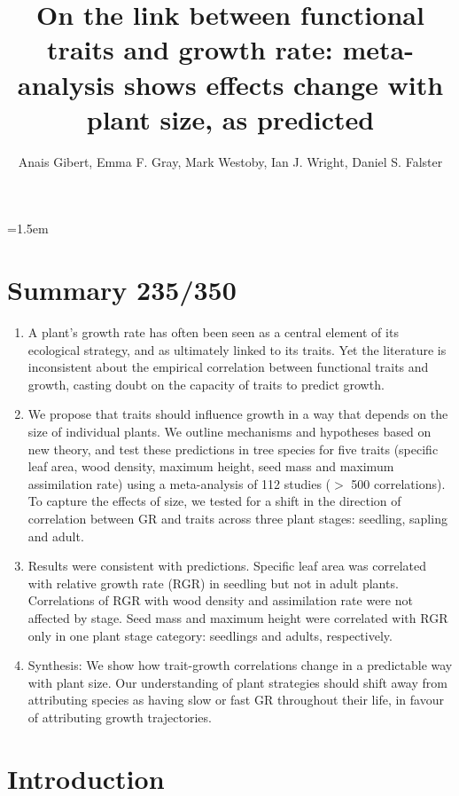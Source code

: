 \documentclass[a4paper,11pt]{article}
\title{On the link between functional traits and growth rate: meta-analysis shows effects change with plant size, as predicted}
\author{Anais Gibert\textasteriskcentered, Emma F. Gray, Mark Westoby, Ian J. Wright, Daniel S. Falster}
\affiliation{Biological Sciences, Macquarie University NSW 2109, Australia\\
\textasteriskcentered Email for correspondence: \texttt{anais.gibert@gmail.com}\\
Word count: ~5538 words (without supplementary material, Fig and ref)}
\date{}
\begin{document}
\mstitlepage
\noindent
\parindent=1.5em
\addtolength{\parskip}{.3em}
\doublespacing
\linenumbers
\section{Summary 235/350}\label{abstract}
\begin{enumerate}
\def\labelenumi{\arabic{enumi}.}
\itemsep1pt\parskip0pt
\item A plant's growth rate has often been seen as a central element of its ecological strategy, and as ultimately linked to its traits. Yet the literature is inconsistent about the empirical correlation between functional traits and growth, casting doubt on the capacity of traits to predict growth.

\item We propose that traits should influence growth in a way that depends on the size of individual plants. We outline mechanisms and hypotheses based on new theory, and test these predictions in tree species for five traits (specific leaf area, wood density, maximum height, seed mass and maximum assimilation rate) using a meta-analysis of 112 studies ($>$ 500 correlations). To capture the effects of size, we tested for a shift in the direction of correlation between GR and traits across three plant stages: seedling, sapling and adult.

\item Results were consistent with predictions. Specific leaf area was correlated with relative growth rate (RGR) in seedling but not in adult plants. Correlations of RGR with wood density and assimilation rate were not affected by stage. Seed mass and maximum height were correlated with RGR only in one plant stage category: seedlings and adults, respectively.

\item Synthesis: We show how trait-growth correlations change in a predictable way with plant size. Our understanding of plant strategies should shift away from attributing species as having slow or fast GR throughout their life, in favour of attributing growth trajectories.

\end{enumerate}

\clearpage

\section*{Introduction}\label{introduction}
\end{document}
